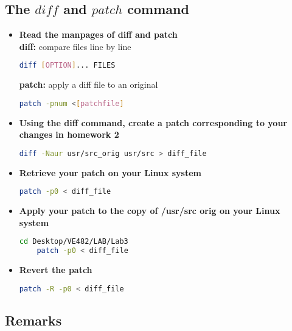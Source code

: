 \documentclass{article}
\begin{document}
\begin{spacing}{2}
\subsection{The $diff$ and $patch$ command}
\begin{itemize}
	\item \textbf{Read the manpages of diff and patch}\\
	\textbf{diff:} compare files line by line\\
	\begin{lstlisting}[language=bash]
	diff [OPTION]... FILES
	\end{lstlisting}
	\textbf{patch:} apply a diff file to an original\\
	\begin{lstlisting}[language=bash]
	patch -pnum <[patchfile]
	\end{lstlisting}
	\item \textbf{Using the diff command, create a patch corresponding to your changes in homework 2}\\
	\begin{lstlisting}[language=bash]
	diff -Naur usr/src_orig usr/src > diff_file
	\end{lstlisting}
	\item \textbf{Retrieve your patch on your Linux system}\\
	\begin{lstlisting}[language=bash]
	patch -p0 < diff_file
	\end{lstlisting}
	\item \textbf{Apply your patch to the copy of /usr/src orig on your Linux system}\\
	\begin{lstlisting}[language=bash]
	cd Desktop/VE482/LAB/Lab3
	patch -p0 < diff_file
	\end{lstlisting}
	\item \textbf{Revert the patch}\\
	\begin{lstlisting}[language=bash]
	patch -R -p0 < diff_file
	\end{lstlisting}
\end{itemize}
\subsection{Remarks}
\end{spacing}
\end{document}
